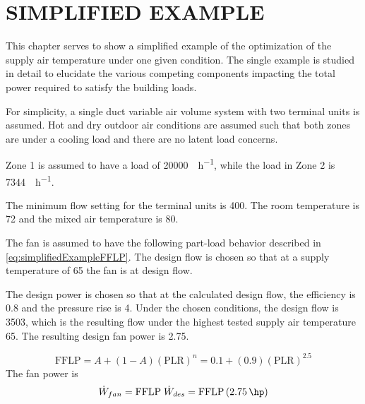 \chapter{\texorpdfstring{\MakeUppercase{Simplified Example}}{Simplified Example}}

This chapter serves to show a simplified example of the optimization of
the supply air temperature under one given condition. The single example
is studied in detail to elucidate the various competing
components impacting the total power required to satisfy the building
loads. 

For simplicity, a single duct variable air volume system with two
terminal units is assumed. Hot and dry outdoor air conditions are
assumed such that both zones are under a cooling load and there are no
latent load concerns.  

Zone 1 is assumed to have a load of \SI{20000}{\btu\per\hour}, while the
load in Zone 2 is \SI{7344}{\btu\per\hour}. 

The minimum flow setting for the terminal units is \SI{400}{\cfm}. The
room temperature is \SI{72}{\degreeF} and the mixed air temperature is
\SI{80}{\degreeF}.

The fan is assumed to have the following part-load behavior described in
 \ref{eq:simplifiedExampleFFLP}. The design
flow is chosen so that at a supply temperature of \SI{65}{\degreeF} the
fan is at design flow. 

The design power is chosen so that at the calculated design flow, the
efficiency is \num{0.8} and the pressure rise is \SI{4}{\inchwater}.
Under the chosen conditions, the design flow is \SI{3503}{\cfm}, which
is the resulting flow under the highest tested supply air temperature
\SI{65}{\degreeF}. The resulting design fan power is \SI{2.75}{\hp}. 

\begin{equation}\label{eq:simplifiedExampleFFLP}
    \text{FFLP} = A + \left(1-A\right)(\text{PLR})^{n} =   0.1 + (0.9)(\text{PLR})^{2.5}
\end{equation}
The fan power is 
\begin{equation}
    \dot{W}_{fan} = \text{FFLP} \; \dot{W}_{des} = \text{FFLP}\left(\SI{2.75}{\hp}\right) 
\end{equation}

